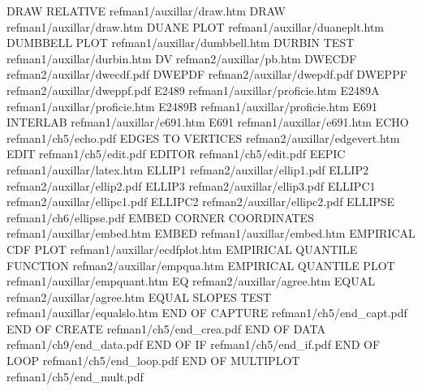 DRAW RELATIVE                           refman1/auxillar/draw.htm
DRAW                                    refman1/auxillar/draw.htm
DUANE PLOT                              refman1/auxillar/duaneplt.htm
DUMBBELL PLOT                           refman1/auxillar/dumbbell.htm
DURBIN TEST                             refman1/auxillar/durbin.htm
DV                                      refman2/auxillar/pb.htm
DWECDF                                  refman2/auxillar/dwecdf.pdf
DWEPDF                                  refman2/auxillar/dwepdf.pdf
DWEPPF                                  refman2/auxillar/dweppf.pdf
E2489                                   refman1/auxillar/proficie.htm
E2489A                                  refman1/auxillar/proficie.htm
E2489B                                  refman1/auxillar/proficie.htm
E691 INTERLAB                           refman1/auxillar/e691.htm
E691                                    refman1/auxillar/e691.htm
ECHO                                    refman1/ch5/echo.pdf
EDGES TO VERTICES                       refman2/auxillar/edgevert.htm
EDIT                                    refman1/ch5/edit.pdf
EDITOR                                  refman1/ch5/edit.pdf
EEPIC                                   refman1/auxillar/latex.htm
ELLIP1                                  refman2/auxillar/ellip1.pdf
ELLIP2                                  refman2/auxillar/ellip2.pdf
ELLIP3                                  refman2/auxillar/ellip3.pdf
ELLIPC1                                 refman2/auxillar/ellipc1.pdf
ELLIPC2                                 refman2/auxillar/ellipc2.pdf
ELLIPSE                                 refman1/ch6/ellipse.pdf
EMBED CORNER COORDINATES                refman1/auxillar/embed.htm
EMBED                                   refman1/auxillar/embed.htm
EMPIRICAL CDF PLOT                      refman1/auxillar/ecdfplot.htm
EMPIRICAL QUANTILE FUNCTION             refman2/auxillar/empqua.htm
EMPIRICAL QUANTILE PLOT                 refman1/auxillar/empquant.htm
EQ                                      refman2/auxillar/agree.htm
EQUAL                                   refman2/auxillar/agree.htm
EQUAL SLOPES TEST                       refman1/auxillar/equalslo.htm
END OF CAPTURE                          refman1/ch5/end_capt.pdf
END OF CREATE                           refman1/ch5/end_crea.pdf
END OF DATA                             refman1/ch9/end_data.pdf
END OF IF                               refman1/ch5/end_if.pdf
END OF LOOP                             refman1/ch5/end_loop.pdf
END OF MULTIPLOT                        refman1/ch5/end_mult.pdf

